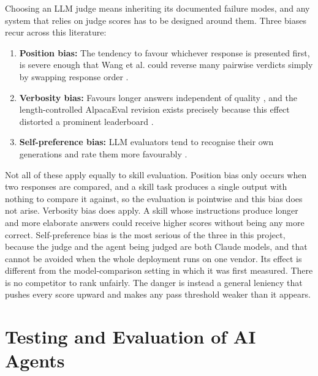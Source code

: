 \noindent Choosing an LLM judge means inheriting its documented failure modes, and any system that relies on judge scores has to be designed around them. Three biases recur across this literature:
\begin{enumerate}
    \item \textbf{Position bias:} The tendency to favour whichever response is presented first, is severe enough that Wang et al. could reverse many pairwise verdicts simply by swapping response order \cite{wang2024notfair}\cite{zheng2023mtbench}. 
    \item \textbf{Verbosity bias:} Favours longer answers independent of quality \cite{zheng2023mtbench}, and the length-controlled AlpacaEval revision exists precisely because this effect distorted a prominent leaderboard \cite{dubois2024lengthcontrolled}.
    \item \textbf{Self-preference bias:} LLM evaluators tend to recognise their own generations and rate them more favourably \cite{panickssery2024selfpreference}. 
\end{enumerate}

Not all of these apply equally to skill evaluation. Position bias only occurs when two responses are compared, and a skill task produces a single output with nothing to compare it against, so the evaluation is pointwise and this bias does not arise. Verbosity bias does apply. A skill whose instructions produce longer and more elaborate answers could receive higher scores without being any more correct. Self-preference bias is the most serious of the three in this project, because the judge and the agent being judged are both Claude models, and that cannot be avoided when the whole deployment runs on one vendor. Its effect is different from the model-comparison setting in which it was first measured. There is no competitor to rank unfairly. The danger is instead a general leniency that pushes every score upward and makes any pass threshold weaker than it appears.

\section{Testing and Evaluation of AI Agents}

